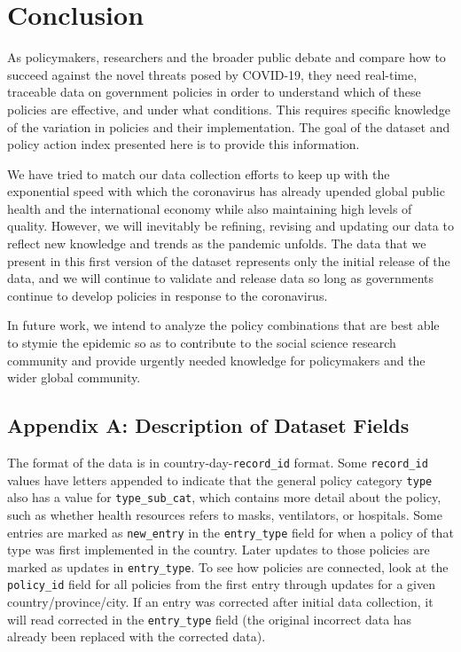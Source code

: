 \documentclass[]{article}
\begin{document}
\hypertarget{conclusion}{%
\section{Conclusion}\label{conclusion}}

As policymakers, researchers and the broader public debate and compare how to succeed against the novel threats posed by COVID-19, they need real-time, traceable data on government policies in order to understand which of these policies are effective, and under what conditions. This requires specific knowledge of the variation in policies and their implementation. The goal of the dataset and policy action index presented here is to provide this information.

We have tried to match our data collection efforts to keep up with the exponential speed with which the coronavirus has already upended global public health and the international economy while also maintaining high levels of quality. However, we will inevitably be refining, revising and updating our data to reflect new knowledge and trends as the pandemic unfolds. The data that we present in this first version of the dataset represents only the initial release of the data, and we will continue to validate and release data so long as governments continue to develop policies in response to the coronavirus.

In future work, we intend to analyze the policy combinations that are best able to stymie the epidemic so as to contribute to the social science research community and provide urgently needed knowledge for policymakers and the wider global community.

\hypertarget{appendix-a-description-of-dataset-fields}{%
\subsection*{Appendix A: Description of Dataset Fields}\label{appendix-a-description-of-dataset-fields}}

The format of the data is in country-day-\texttt{record\_id} format. Some \texttt{record\_id} values have letters appended to indicate that the general policy category \texttt{type} also has a value for \texttt{type\_sub\_cat}, which contains more detail about the policy, such as whether health resources refers to masks, ventilators, or hospitals. Some entries are marked as \texttt{new\_entry} in the \texttt{entry\_type} field for when a policy of that type was first implemented in the country. Later updates to those policies are marked as updates in \texttt{entry\_type}. To see how policies are connected, look at the \texttt{policy\_id} field for all policies from the first entry through updates for a given country/province/city. If an entry was corrected after initial data collection, it will read corrected in the \texttt{entry\_type} field (the original incorrect data has already been replaced with the corrected data).
\end{document}
